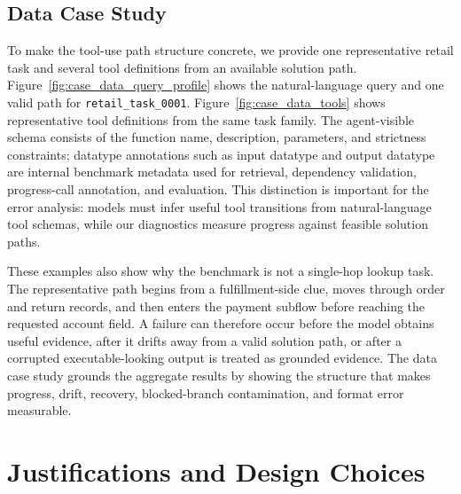 \documentclass{llmxive}
\begin{document}
\subsection{Data Case Study}
\label{app:data-case-study}

To make the tool-use path structure concrete, we provide one representative retail task and several tool definitions from an available solution path. Figure~\ref{fig:case_data_query_profile} shows the natural-language query and one valid path for \texttt{retail\_task\_0001}. Figure~\ref{fig:case_data_tools} shows representative tool definitions from the same task family. The agent-visible schema consists of the function name, description, parameters, and strictness constraints; datatype annotations such as input datatype and output datatype are internal benchmark metadata used for retrieval, dependency validation, progress-call annotation, and evaluation. This distinction is important for the error analysis: models must infer useful tool transitions from natural-language tool schemas, while our diagnostics measure progress against feasible solution paths.

These examples also show why the benchmark is not a single-hop lookup task. The representative path begins from a fulfillment-side clue, moves through order and return records, and then enters the payment subflow before reaching the requested account field. A failure can therefore occur before the model obtains useful evidence, after it drifts away from a valid solution path, or after a corrupted executable-looking output is treated as grounded evidence. The data case study grounds the aggregate results by showing the structure that makes progress, drift, recovery, blocked-branch contamination, and format error measurable.


\section{Justifications and Design Choices}
\label{app:justifications}
\end{document}
